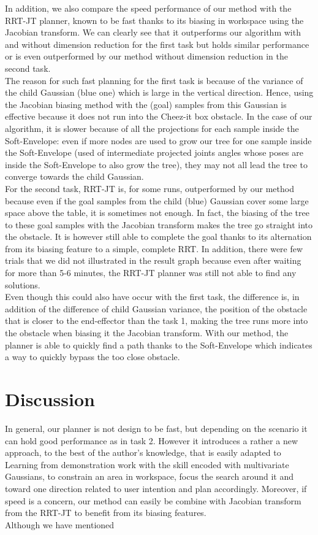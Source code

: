 \documentclass[letterpaper, 10 pt, conference]{ieeeconf}  %
\begin{document}
In addition, we also compare the speed performance of our method with the RRT-JT planner, known to be fast thanks to its biasing in workspace using the Jacobian transform. We can clearly see that it outperforms our algorithm with and without dimension reduction for the first task but holds similar performance or is even outperformed by our method without dimension reduction in the second task.\\
The reason for such fast planning for the first task is because of the variance of the child Gaussian (blue one) which is large in the vertical direction. Hence, using the Jacobian biasing method with the (goal) samples from this Gaussian is effective because it does not run into the Cheez-it box obstacle. In the case of our algorithm, it is slower because of all the projections for each sample inside the Soft-Envelope: even if more nodes are used to grow our tree for one sample inside the Soft-Envelope (used of intermediate projected joints angles whose poses are inside the Soft-Envelope to also grow the tree), they may not all lead the tree to converge towards the child Gaussian.\\
For the second task, RRT-JT is, for some runs, outperformed by our method because even if the goal samples from the child (blue) Gaussian cover some large space above the table, it is sometimes not enough. In fact, the biasing of the tree to these goal samples with the Jacobian transform makes the tree go straight into the obstacle. It is however still able to complete the goal thanks to its alternation from its biasing feature to a simple, complete RRT. In addition, there were few trials that we did not illustrated in the result graph because even after waiting for more than 5-6 minutes, the RRT-JT planner was still not able to find any solutions.\\
 Even though this could also have occur with the first task, the difference is, in addition of the difference of child Gaussian variance, the position of the obstacle that is closer to the end-effector than the task 1, making the tree runs more into the obstacle when biasing it the Jacobian transform. With our method, the planner is able to quickly find a path thanks to the Soft-Envelope which indicates a way to quickly bypass the too close obstacle.

\section{Discussion}
In general, our planner is not design to be fast, but depending on the scenario it can hold good performance as in task 2. However it introduces a rather a new approach, to the best of the author's knowledge, that is easily adapted to Learning from demonstration work with the skill encoded with multivariate Gaussians, to constrain an area in workspace, focus the search around it and toward one direction related to user intention and plan accordingly. 
Moreover, if speed is a concern, our method can easily be combine with Jacobian transform from the RRT-JT to benefit from its biasing features.\\
Although we have mentioned 
\end{document}
